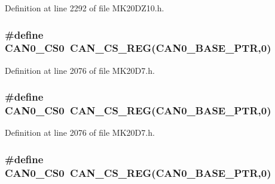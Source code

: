 Definition at line 2292 of file M\+K20\+D\+Z10.\+h.

\subsubsection[{\texorpdfstring{C\+A\+N0\+\_\+\+C\+S0}{CAN0_CS0}}]{\setlength{\rightskip}{0pt plus 5cm}\#define C\+A\+N0\+\_\+\+C\+S0~{\bf C\+A\+N\+\_\+\+C\+S\+\_\+\+R\+EG}({\bf C\+A\+N0\+\_\+\+B\+A\+S\+E\+\_\+\+P\+TR},0)}\hypertarget{group___c_a_n___register___accessor___macros_gac3e74f43b32eff78481b9c2bc3960914}{}\label{group___c_a_n___register___accessor___macros_gac3e74f43b32eff78481b9c2bc3960914}


Definition at line 2076 of file M\+K20\+D7.\+h.

\subsubsection[{\texorpdfstring{C\+A\+N0\+\_\+\+C\+S0}{CAN0_CS0}}]{\setlength{\rightskip}{0pt plus 5cm}\#define C\+A\+N0\+\_\+\+C\+S0~{\bf C\+A\+N\+\_\+\+C\+S\+\_\+\+R\+EG}({\bf C\+A\+N0\+\_\+\+B\+A\+S\+E\+\_\+\+P\+TR},0)}\hypertarget{group___c_a_n___register___accessor___macros_gac3e74f43b32eff78481b9c2bc3960914}{}\label{group___c_a_n___register___accessor___macros_gac3e74f43b32eff78481b9c2bc3960914}


Definition at line 2076 of file M\+K20\+D7.\+h.

\subsubsection[{\texorpdfstring{C\+A\+N0\+\_\+\+C\+S0}{CAN0_CS0}}]{\setlength{\rightskip}{0pt plus 5cm}\#define C\+A\+N0\+\_\+\+C\+S0~{\bf C\+A\+N\+\_\+\+C\+S\+\_\+\+R\+EG}({\bf C\+A\+N0\+\_\+\+B\+A\+S\+E\+\_\+\+P\+TR},0)}\hypertarget{group___c_a_n___register___accessor___macros_gac3e74f43b32eff78481b9c2bc3960914}{}\label{group___c_a_n___register___accessor___macros_gac3e74f43b32eff78481b9c2bc3960914}


